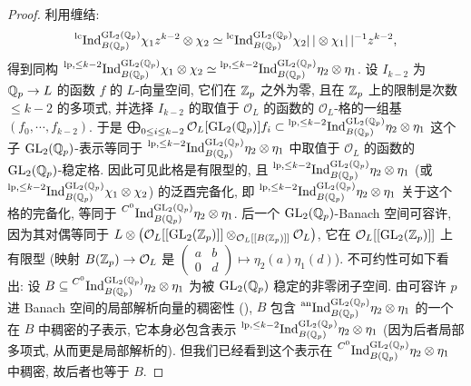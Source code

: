 \begin{proof}
利用缠结:
\[
\prescript{\mathrm{lc}}{}{\mathrm{Ind}}_{B(\mathbb{Q}_p)}^{\mathrm{GL}_2(\mathbb{Q}_p)} \chi_1 z^{k-2} \otimes \chi_2 \simeq \prescript{\mathrm{lc}}{}{\mathrm{Ind}}_{B(\mathbb{Q}_p)}^{\mathrm{GL}_2(\mathbb{Q}_p)} \chi_2|\,| \otimes \chi_1|\,|^{-1}z^{k-2},
\]
得到同构 $\prescript{\mathrm{lp},\le k-2}{}{\mathrm{Ind}}_{B(\mathbb{Q}_p)}^{\mathrm{GL}_2(\mathbb{Q}_p)} \chi_1 \otimes \chi_2 \simeq \prescript{\mathrm{lp},\le k-2}{}{\mathrm{Ind}}_{B(\mathbb{Q}_p)}^{\mathrm{GL}_2(\mathbb{Q}_p)} \eta_2 \otimes \eta_1$.
设 $I_{k-2}$ 为 $\mathbb{Q}_p \to L$ 的函数 $f$ 的 $L$-向量空间, 它们在 $\mathbb{Z}_p$ 之外为零, 且在 $\mathbb{Z}_p$ 上的限制是次数 $\le k-2$ 的多项式, 并选择 $I_{k-2}$ 的取值于 $\mathcal{O}_L$ 的函数的 $\mathcal{O}_L$-格的一组基 $(f_0,\cdots,f_{k-2})$.
于是 $\bigoplus_{0 \le i \le k-2} \mathcal{O}_L[\mathrm{GL}_2(\mathbb{Q}_p)]f_i \subset \prescript{\mathrm{lp},\le k-2}{}{\mathrm{Ind}}_{B(\mathbb{Q}_p)}^{\mathrm{GL}_2(\mathbb{Q}_p)} \eta_2 \otimes \eta_1$ 这个子 $\mathrm{GL}_2(\mathbb{Q}_p)$-表示等同于 $\prescript{\mathrm{lp},\le k-2}{}{\mathrm{Ind}}_{B(\mathbb{Q}_p)}^{\mathrm{GL}_2(\mathbb{Q}_p)} \eta_2 \otimes \eta_1$ 中取值于 $\mathcal{O}_L$ 的函数的 $\mathrm{GL}_2(\mathbb{Q}_p)$-稳定格.
因此可见此格是有限型的, 且 $\prescript{\mathrm{lp},\le k-2}{}{\mathrm{Ind}}_{B(\mathbb{Q}_p)}^{\mathrm{GL}_2(\mathbb{Q}_p)} \eta_2 \otimes \eta_1$ (或 $\prescript{\mathrm{lp},\le k-2}{}{\mathrm{Ind}}_{B(\mathbb{Q}_p)}^{\mathrm{GL}_2(\mathbb{Q}_p)} \chi_1 \otimes \chi_2$) 的泛酉完备化, 即 $\prescript{\mathrm{lp},\le k-2}{}{\mathrm{Ind}}_{B(\mathbb{Q}_p)}^{\mathrm{GL}_2(\mathbb{Q}_p)} \eta_2 \otimes \eta_1$ 关于这个格的完备化, 等同于 $\prescript{C^{0}}{}{\mathrm{Ind}}_{B(\mathbb{Q}_p)}^{\mathrm{GL}_2(\mathbb{Q}_p)} \eta_2 \otimes \eta_1$.
后一个 $\mathrm{GL}_2(\mathbb{Q}_p)$-Banach 空间可容许, 因为其对偶等同于 $L \otimes \bigl(\mathcal{O}_L[[\mathrm{GL}_2(\mathbb{Z}_p)]] \otimes_{\mathcal{O}_L[[B(\mathbb{Z}_p)]]} \mathcal{O}_L\bigr)$, 它在 $\mathcal{O}_L[[\mathrm{GL}_2(\mathbb{Z}_p)]]$ 上有限型 (映射 $B(\mathbb{Z}_p) \to \mathcal{O}_L$ 是 $\begin{pmatrix} a & b \\ 0 & d \end{pmatrix} \mapsto \eta_2(a)\eta_1(d)$).
不可约性可如下看出: 设 $B \subseteq \prescript{C^{0}}{}{\mathrm{Ind}}_{B(\mathbb{Q}_p)}^{\mathrm{GL}_2(\mathbb{Q}_p)} \eta_2 \otimes \eta_1$ 为被 $\mathrm{GL}_2(\mathbb{Q}_p)$ 稳定的非零闭子空间.
由可容许 $p$ 进 Banach 空间的局部解析向量的稠密性 (\cite[Th.~7.1]{ref:45}), $B$ 包含 $\prescript{\mathrm{an}}{}{\mathrm{Ind}}_{B(\mathbb{Q}_p)}^{\mathrm{GL}_2(\mathbb{Q}_p)} \eta_2 \otimes \eta_1$ 的一个在 $B$ 中稠密的子表示, 它本身必包含表示 $\prescript{\mathrm{lp},\le k-2}{}{\mathrm{Ind}}_{B(\mathbb{Q}_p)}^{\mathrm{GL}_2(\mathbb{Q}_p)} \eta_2 \otimes \eta_1$ (因为后者局部多项式, 从而更是局部解析的).
但我们已经看到这个表示在 $\prescript{C^{0}}{}{\mathrm{Ind}}_{B(\mathbb{Q}_p)}^{\mathrm{GL}_2(\mathbb{Q}_p)} \eta_2 \otimes \eta_1$ 中稠密, 故后者也等于 $B$.
\end{proof}

